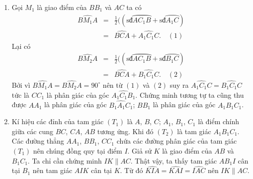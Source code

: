 \begin{vd}
{\begin{enumerate}
{
}
\item Gọi $M_1$ là giao điểm của $BB_1$ và $AC$ ta có
\begin{eqnarray*}
\widehat{BM_1A}&=&\frac{1}{2}((\text{sđ}\wideparen{AC_1B}+\text{sđ}\wideparen{A_1C})\\ 
&=& \widehat{BCA}+\widehat{A_1C_1C}.  \quad(1)
\end{eqnarray*}
Lại có 
\begin{eqnarray*}
\widehat{BM_2A}&=&\frac{1}{2}((\text{sđ}\wideparen{AC_1B}+\text{sđ}\wideparen{B_1C})\\ 
&=& \widehat{BCA}+\widehat{B_1C_1C}.  \quad(2)
\end{eqnarray*}
Bởi vì $\widehat{BM_1A}=\widehat{BM_2A}=90^\circ$ nên từ $(1)$ và $(2)$ suy ra $\widehat{A_1C_1C}=\widehat{B_1C_1C}$ tức là $CC_1$ là phân giác của góc $\widehat{A_1C_1B_1}$. Chứng minh tương tự ta cũng thu được $AA_1$ là phân giác của góc $\widehat{B_1A_1C_1}$; $BB_1$ là phân giác của góc $A_1B_1C_1$.
\item Kí hiệu các đỉnh của tam giác $(T_1)$ là $A$, $B$, $C$; $A_1$, $B_1$, $C_1$ là điểm chính giữa các cung $BC$, $CA$, $AB$ tương ứng. Khi đó $(T_2)$ là tam giác $A_1B_1C_1$. Các đường thẳng $AA_1$, $BB_1$, $CC_1$ chứa các đường phân giác của tam giác $(T_1)$ nên chúng đồng quy tại điểm $I$. Giả sử $K$ là giao điểm của $AB$ và $B_1C_1$. Ta chỉ cần chứng minh $IK \parallel AC$.
Thật vậy, ta thấy tam giác $AB_1I$ cân tại $B_1$ nên tam giác $AIK$ cân tại $K$. Từ đó $\widehat{KIA}=\widehat{KAI}=\widehat{IAC}$ nên $IK \parallel AC$.
\end{enumerate}
}
\end{vd}


